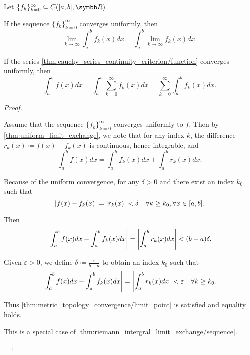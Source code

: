 \begin{corollary}\label{thm:riemann_intergral_limit_exchange}\cite[]{Фихтенгольц1968/2}
  Let \( \{ f_k \}_{k=0}^\infty \subseteq C([a, b], \BR) \).

  \begin{thmenum}
     If the sequence \( \{ f_k \}_{k=0}^\infty \) converges uniformly, then
    \begin{equation*}
      \lim_{k \to \infty} \int_a^b f_k(x) dx = \int_a^b \lim_{k \to \infty} f_k(x) dx.
    \end{equation*}

     If the series \cref{thm:cauchy_series_continuity_criterion/function} converges uniformly, then
    \begin{equation*}
      \int_a^b f(x) dx = \int_a^b \sum_{k=0}^\infty f_k(x) dx = \sum_{k=0}^\infty \int_a^b f_k(x) dx.
    \end{equation*}
  \end{thmenum}
\end{corollary}
\begin{proof}
  \begin{description}
     Assume that the sequence \( \{ f_k \}_{k=0}^\infty \) converges uniformly to \( f \). Then by \cref{thm:uniform_limit_exchange}, we note that for any index \( k \), the difference \( r_k(x) \coloneqq f(x) - f_k(x) \) is continuous, hence integrable, and
    \begin{equation*}
      \int_a^b f(x) dx = \int_a^b f_k(x) dx + \int_a^b r_k(x) dx.
    \end{equation*}

    Because of the uniform convergence, for any \( \delta > 0 \) and there exist an index \( k_0 \) such that
    \begin{equation*}
      \left\vert f(x) - f_k(x) \right\vert = \left\vert r_k(x) \right\vert < \delta \quad\forall k \geq k_0, \forall x \in [a, b].
    \end{equation*}

    Then
    \begin{equation*}
      \left\vert \int_a^b f(x) dx - \int_a^b f_k(x) dx \right\vert = \left\vert \int_a^b r_k(x) dx \right\vert < (b - a) \delta.
    \end{equation*}

    Given \( \varepsilon > 0 \), we define \( \delta \coloneqq \frac \varepsilon {b - a} \) to obtain an index \( k_0 \) such that
    \begin{equation*}
      \left\vert \int_a^b f(x) dx - \int_a^b f_k(x) dx \right\vert = \left\vert \int_a^b r_k(x) dx \right\vert < \varepsilon \quad\forall k \geq k_0.
    \end{equation*}

    Thus \cref{thm:metric_topology_convergence/limit_point} is satisfied and equality holds.

     This is a special case of \cref{thm:riemann_intergral_limit_exchange/sequence}.
  \end{description}
\end{proof}

